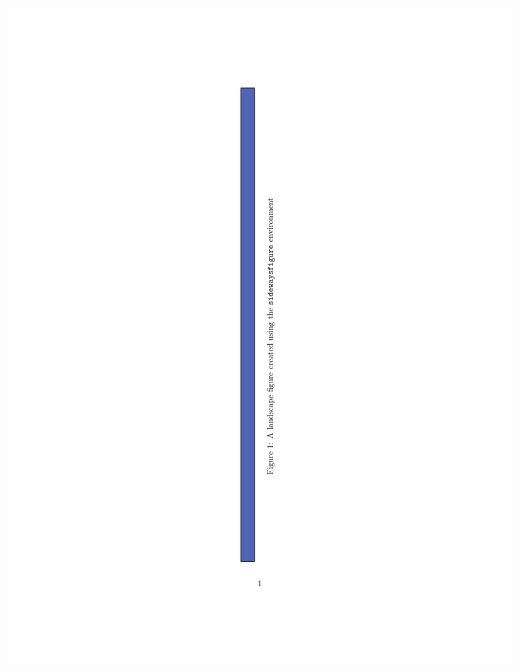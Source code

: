 \documentclass[article]{beamer}
\begin{document}
\begin{frame}
\begin{columns}
\begin{column}{0.5\textwidth}
      \colorbox{white}{\includegraphics[height=0.9\textheight]{sidewaysfigure_example.pdf}}
    \end{column}
  \end{columns}
\end{frame}
\end{document}
